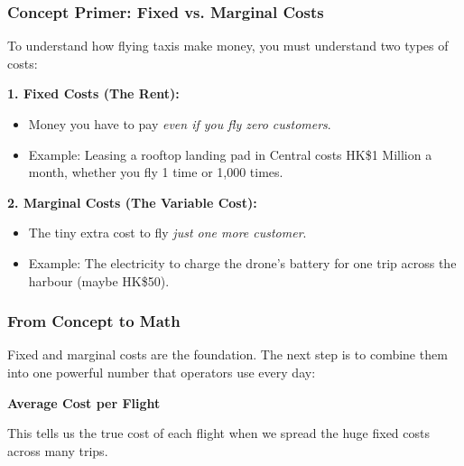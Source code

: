 \documentclass{beamer}
\begin{document}
\begin{frame}[t]
  \frametitle{Concept Primer: Fixed vs. Marginal Costs}
 
  To understand how flying taxis make money, you must understand two types of costs:
  
  \vspace{0.3cm}
  
  \textbf{1. Fixed Costs (The Rent):}
  \begin{itemize}
      \item Money you have to pay \textit{even if you fly zero customers}.
      \item Example: Leasing a rooftop landing pad in Central costs HK\$1 Million a month, whether you fly 1 time or 1,000 times.
  \end{itemize}
  \vspace{0.3cm}
  \textbf{2. Marginal Costs (The Variable Cost):}
  \begin{itemize}
      \item The tiny extra cost to fly \textit{just one more customer}.
      \item Example: The electricity to charge the drone's battery for one trip across the harbour (maybe HK\$50).
  \end{itemize}
\end{frame}

\begin{frame}[t]
  \frametitle{From Concept to Math}
 
  Fixed and marginal costs are the foundation.  
  The next step is to combine them into one powerful number that operators use every day:
  
  \vspace{0.5cm}
  \centering
  \Large\textbf{Average Cost per Flight}
  
  \vspace{0.3cm}
  This tells us the true cost of each flight when we spread the huge fixed costs across many trips.
\end{frame}
\end{document}
